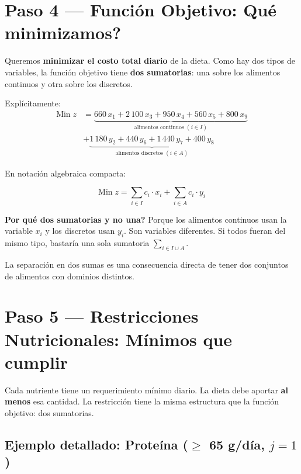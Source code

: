 \documentclass[12pt]{article}
\begin{document}
\section{Paso 4 --- Funci\'on Objetivo: \textquestiondown Qu\'e minimizamos?}

Queremos \textbf{minimizar el costo total diario} de la dieta. Como hay dos tipos de variables, la funci\'on objetivo tiene \textbf{dos sumatorias}: una sobre los alimentos continuos y otra sobre los discretos.

Expl\'icitamente:
\begin{align*}
    \text{Min}\; z &= \underbrace{660\,x_1 + 2\,100\,x_3 + 950\,x_4 + 560\,x_5 + 800\,x_9}_{\text{alimentos continuos } (i \in I)} \\[4pt]
    &+ \underbrace{1\,180\,y_2 + 440\,y_6 + 1\,440\,y_7 + 400\,y_8}_{\text{alimentos discretos } (i \in A)}
\end{align*}

En notaci\'on algebraica compacta:

\[
    \text{Min}\; z = \sum_{i \in I} c_i \cdot x_i + \sum_{i \in A} c_i \cdot y_i
\]

\begin{cajazul}
\textbf{\textquestiondown Por qu\'e dos sumatorias y no una?} Porque los alimentos continuos usan la variable $x_i$ y los discretos usan $y_i$. Son variables diferentes. Si todos fueran del mismo tipo, bastar\'ia una sola sumatoria $\sum_{i \in I \cup A}$.

La separaci\'on en dos sumas es una consecuencia directa de tener dos conjuntos de alimentos con dominios distintos.
\end{cajazul}

\section{Paso 5 --- Restricciones Nutricionales: M\'inimos que cumplir}

Cada nutriente tiene un requerimiento m\'inimo diario. La dieta debe aportar \textbf{al menos} esa cantidad. La restricci\'on tiene la misma estructura que la funci\'on objetivo: dos sumatorias.

\subsection*{Ejemplo detallado: Prote\'ina ($\geq$ 65 g/d\'ia, $j = 1$)}
\end{document}
